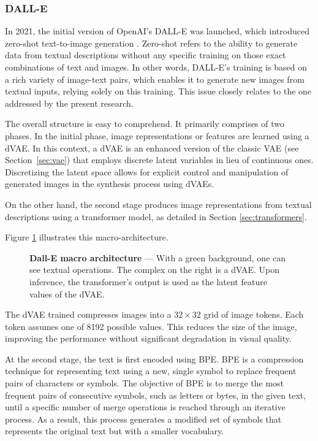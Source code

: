 \subsubsection{DALL-E} \label{sec:dall-e}

In 2021, the initial version of OpenAI's DALL-E was launched, which introduced zero-shot text-to-image generation \cite{ramesh_zero-shot_2021}. Zero-shot refers to the ability to generate data from textual descriptions without any specific training on those exact combinations of text and images. In other words, DALL-E's training is based on a rich variety of image-text pairs, which enables it to generate new images from textual inputs, relying solely on this training. This issue closely relates to the one addressed by the present research.

The overall structure is easy to comprehend. It primarily comprises of two phases. In the initial phase, image representations or features are learned using a \ac{dVAE}. In this context, a \ac{dVAE} is an enhanced version of the classic \ac{VAE} (see Section~\ref{sec:vae}) that employs discrete latent variables in lieu of continuous ones. Discretizing the latent space allows for explicit control and manipulation of generated images in the synthesis process using \acp{dVAE}.

On the other hand, the second stage produces image representations from textual descriptions using a transformer model, as detailed in Section \ref{sec:transformers}.

Figure \ref{fig:dall-e} illustrates this macro-architecture.

\begin{figure}[ht]
    \centering
    \caption[Dall-E macro architecture]{\textbf{Dall-E macro architecture} --- With a green background, one can see textual operations. The complex on the right is a \ac{dVAE}. Upon inference, the transformer's output is used as the latent feature values of the \ac{dVAE}.}
    \label{fig:dall-e}
\end{figure}

The \acf{dVAE} trained compresses images into a $32 \times 32$ grid of image tokens. Each token assumes one of 8192 possible values. This reduces the size of the image, improving the performance without significant degradation in visual quality.

At the second stage, the text is first encoded using \ac{BPE}. \Ac{BPE} is a compression technique for representing text using a new, single symbol to replace frequent pairs of characters or symbols. The objective of \ac{BPE} is to merge the most frequent pairs of consecutive symbols, such as letters or bytes, in the given text, until a specific number of merge operations is reached through an iterative process. As a result, this process generates a modified set of symbols that represents the original text but with a smaller vocabulary.

